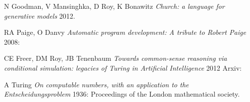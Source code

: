 




  \begin{thebibliography}{1}

   N Goodman, V Mansinghka, D Roy, K Bonawitz {\em Church: a language for generative models}  2012.

    RA Paige, O Danvy {\em Automatic program development: A tribute to Robert Paige} 2008:

   CE Freer, DM Roy, JB Tenenbaum {\em Towards common-sense reasoning via conditional simulation: legacies of Turing in Artificial Intelligence} 2012 Arxiv:

   A Turing {\em On computable numbers, with an application to the Entscheidungsproblem} 1936: Proceedings of the London mathematical society.

  \end{thebibliography}





